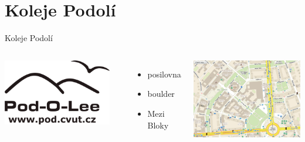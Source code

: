 \documentclass{beamer}
\begin{document}
\section{Koleje Podolí}
\begin{frame}{Koleje Podolí}
	\begin{columns}[c]
			\begin{center}
				\includegraphics[width=0.9\textwidth]{logo_pod.png}
			\end{center}

			\begin{itemize}
				\item posilovna
				\item boulder
				\item Mezi Bloky
			\end{itemize}
			\begin{center}
				\includegraphics[width=\textwidth]{mapa_all.png}
			\end{center}
	\end{columns}

\end{frame}
\end{document}
